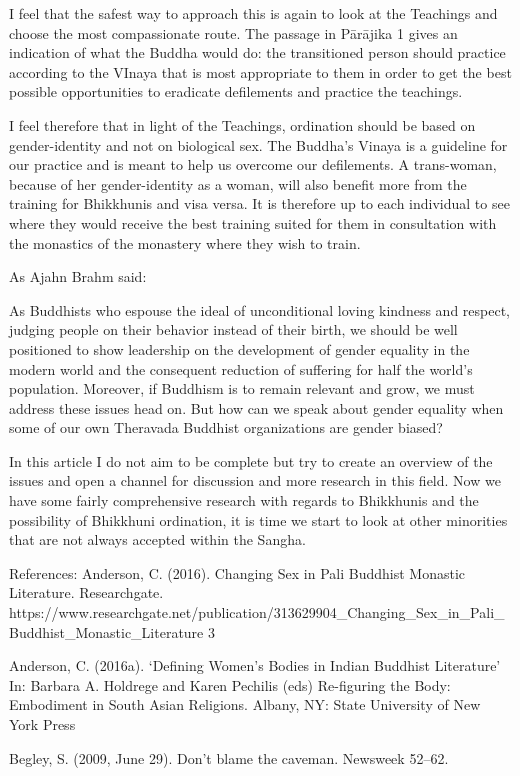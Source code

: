 I feel that the safest way to approach this is again to look at the Teachings and choose the most compassionate route. The passage in Pārājika 1 gives an indication of what the Buddha would do: the transitioned person should practice according to the VInaya that is most appropriate to them in order to get the best possible opportunities to eradicate defilements and practice the teachings.

I feel therefore that in light of the Teachings, ordination should be based on gender-identity and not on biological sex. The Buddha’s Vinaya is a guideline for our practice and is meant to help us overcome our defilements. A trans-woman, because of her gender-identity as a woman, will also benefit more from the training for Bhikkhunis and visa versa. It is therefore up to each individual to see where they would receive the best training suited for them in consultation with the monastics of the monastery where they wish to train.

As Ajahn Brahm said:

As Buddhists who espouse the ideal of unconditional loving kindness and respect, judging people on their behavior instead of their birth, we should be well positioned to show leadership on the development of gender equality in the modern world and the consequent reduction of suffering for half the world’s population. Moreover, if Buddhism is to remain relevant and grow, we must address these issues head on. But how can we speak about gender equality when some of our own Theravada Buddhist organizations are gender biased?

In this article I do not aim to be complete but try to create an overview of the issues and open a channel for discussion and more research in this field. Now we have some fairly comprehensive research with regards to Bhikkhunis and the possibility of Bhikkhuni ordination, it is time we start to look at other minorities that are not always accepted within the Sangha.

References:
Anderson, C. (2016). Changing Sex in Pali Buddhist Monastic Literature. Researchgate.
https://www.researchgate.net/publication/313629904_Changing_Sex_in_Pali_Buddhist_Monastic_Literature 3

Anderson, C. (2016a). ‘Defining Women’s Bodies in Indian Buddhist Literature’ In: Barbara A. Holdrege and Karen Pechilis (eds) Re-figuring the Body: Embodiment in South Asian Religions. Albany, NY: State University of New York Press

Begley, S. (2009, June 29). Don’t blame the caveman. Newsweek 52–62.

